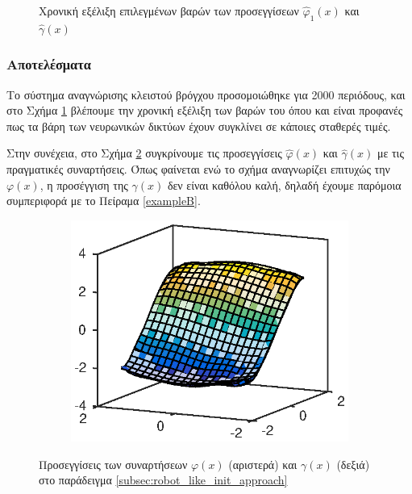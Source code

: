 \begin{figure}
	\begin{subfigure}{0.5\textwidth}
		
	\end{subfigure}
	\begin{subfigure}{0.5\textwidth}
	
	\end{subfigure}
	\caption{Χρονική εξέλιξη επιλεγμένων βαρών των προσεγγίσεων $\hat{\varphi}_1(x)$ και $\hat{\gamma}(x)$}
	\label{fig:robot_like_w_conv}
\end{figure}


\subsubsection{Αποτελέσματα}
Το σύστημα αναγνώρισης κλειστού βρόγχου προσομοιώθηκε για 2000 περιόδους, και στο Σχήμα \ref{fig:robot_like_w_conv} βλέπουμε την χρονική εξέλιξη των βαρών του όπου και είναι προφανές πως τα βάρη των νευρωνικών δικτύων έχουν συγκλίνει σε κάποιες σταθερές τιμές. 

Στην συνέχεια, στο Σχήμα \ref{fig:robot_like_approximations} συγκρίνουμε τις προσεγγίσεις $\hat{\varphi}(x)$ και $\hat{\gamma}(x)$ με τις πραγματικές συναρτήσεις. Όπως φαίνεται ενώ το σχήμα αναγνωρίζει επιτυχώς την $\varphi(x)$, η προσέγγιση της $\gamma(x)$ δεν είναι καθόλου καλή, δηλαδή έχουμε παρόμοια συμπεριφορά με το Πείραμα \ref{exampleB}.

\begin{figure}
	\begin{subfigure}{0.5\textwidth}
		\includegraphics{plots/conclusions/robot_like/phi_approx.eps}
	\end{subfigure}
	\begin{subfigure}{0.5\textwidth}
		
	\end{subfigure}
	\caption{Προσεγγίσεις των συναρτήσεων $\varphi(x)$ (αριστερά) και $\gamma(x)$ (δεξιά) στο παράδειγμα \ref{subsec:robot_like_init_approach}}
	\label{fig:robot_like_approximations}
\end{figure}


